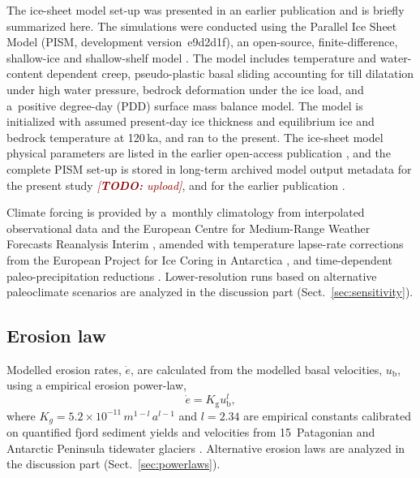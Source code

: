 \documentclass[utf8]{article}
\newcommand{\todo}[1]{\textcolor{darkred}{\emph{[\textbf{TODO:} #1]}}}
\begin{document}
    The ice-sheet model set-up was presented in an earlier publication
    \citep{Seguinot.etal.2018} and is briefly summarized here. The simulations
    were conducted using the Parallel Ice Sheet Model (PISM, development
    version~e9d2d1f), an open-source, finite-difference, shallow-ice and
    shallow-shelf model
    \citep{PISM-authors.2017}. The model includes temperature and water-content
    dependent creep, pseudo-plastic basal sliding accounting for till
    dilatation under high water pressure, bedrock deformation under the ice
    load, and a~positive degree-day (PDD) surface mass balance model. The model
    is initialized with assumed present-day ice thickness and equilibrium
    ice and bedrock temperature at 120\,ka, and ran to the present.
    The ice-sheet model physical parameters are listed in the earlier
    open-access publication \citep{Seguinot.etal.2018}, and the complete PISM
    set-up is stored in long-term archived model output metadata for the
    present study \todo{upload}, and for the earlier publication
    \citep{Seguinot.2020, Seguinot.2020a}.

    Climate forcing is provided by a~monthly climatology from interpolated
    observational data \citep[WorldClim;][]{Hijmans.etal.2005} and the European
    Centre for Medium-Range Weather Forecasts Reanalysis Interim
    \citep[ERA-Interim;][]{Dee.etal.2011}, amended with temperature lapse-rate
    corrections from the European Project for Ice Coring in Antarctica
    \citep[EPICA;][] {Jouzel.etal.2007}, and time-dependent paleo-precipitation
    reductions \citep{Huybrechts.2002}. Lower-resolution runs based on
    alternative paleoclimate scenarios \citep{Seguinot.etal.2018} are analyzed
    in the discussion part (Sect.~\ref{sec:sensitivity}).

\subsection{Erosion law}

    Modelled erosion rates, $\dot{e}$, are calculated from the modelled basal
    velocities, $u_\mathrm{b}$, using a empirical erosion power-law,
    \begin{equation}
        \dot{e} = K_\mathrm{g} u_\mathrm{b}^l ,
    \end{equation}
    where $K_g = 5.2\times 10^{-11}\,m^{1-l}\,a^{l-1}$ and $l = 2.34$ are
    empirical constants calibrated on quantified fjord sediment yields and
    velocities from 15~Patagonian and Antarctic Peninsula tidewater glaciers
    \citep{Koppes.etal.2015}. Alternative erosion laws are analyzed in the
    discussion part (Sect.~\ref{sec:powerlaws}).
\end{document}
